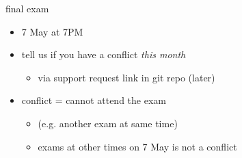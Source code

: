 \begin{frame}{final exam}
    \begin{itemize}
    \item 7 May at 7PM
    \item tell us if you have a conflict \textit{this month}
        \begin{itemize}
        \item via support request link in git repo (later)
        \end{itemize}
    \item conflict = cannot attend the exam
        \begin{itemize}
        \item (e.g. another exam at same time)
        \item exams at other times on 7 May is not a conflict
        \end{itemize}
    \end{itemize}
\end{frame}

